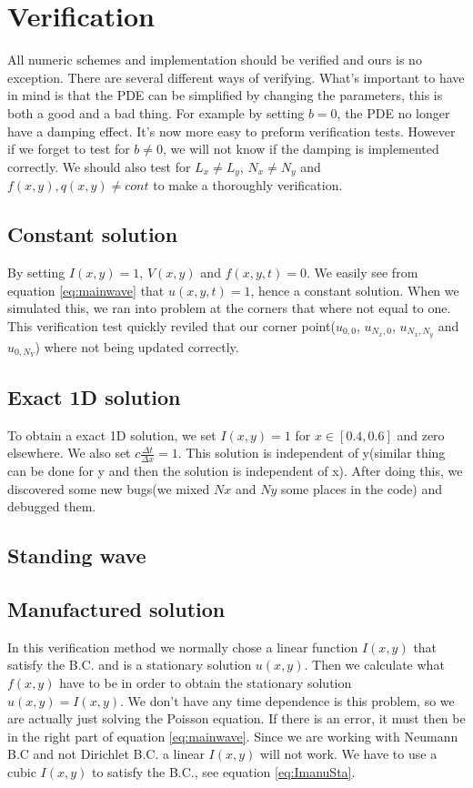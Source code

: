 \documentclass[12pt,a4paper,english]{article}
\begin{document}
\section{Verification}
All numeric schemes and implementation should be verified and ours is no exception. There are several different ways of verifying. What's important to have in mind is that the PDE can be simplified by changing the parameters, this is both a good and a bad thing. For example by setting $b = 0$, the PDE no longer have a damping effect. It's now more easy to preform verification tests. However if we forget to test for $b \neq 0$, we will not know if the damping is implemented correctly. We should also test for $L_x \neq L_y$, $N_x \neq N_y$ and $f(x,y), q(x,y) \neq cont$ to make a thoroughly verification.
\subsection{Constant solution}

By setting $I\left( x,y\right) = 1$, $V\left( x,y\right)$ and $f\left( x,y,t\right) = 0$. We easily see from equation \ref{eq:mainwave} that $u\left( x,y,t\right) = 1$, hence a constant solution. When we simulated this, we ran into problem at the corners that where not equal to one. This verification test quickly reviled that our corner point($u_{0,0}$, $u_{N_x,0}$, $u_{N_x,N_y}$ and $u_{0,N_Y}$) where not being updated correctly.   

\subsection{Exact 1D solution}
To obtain a exact 1D solution, we set $I\left( x,y\right) = 1$ for $x \in \left[0.4 , 0.6\right]$ and zero elsewhere. We also set $c\frac{\Delta t}{\Delta x} = 1$. This solution is independent of y(similar thing can be done for y and then the solution is independent of x). After doing this, we discovered some new bugs(we mixed $Nx$ and $Ny$ some places in the code) and debugged them. 

\subsection{Standing wave}

\subsection{Manufactured solution}
In this verification method we normally chose a linear function $I\left( x,y\right)$ that satisfy the B.C. and is a stationary solution $u\left( x,y\right)$. Then we calculate what $f\left( x,y\right)$ have to be in order to obtain the stationary solution $u\left( x,y\right) = I\left( x,y\right)$. We don't have any time dependence is this problem, so we are actually just solving the Poisson equation. If there is an error, it must then be in the right part of equation \ref{eq:mainwave}. Since we are working with Neumann B.C and not Dirichlet B.C. a linear $I\left( x,y\right)$ will not work. We have to use a cubic $I\left( x,y\right)$ to satisfy the B.C., see equation \ref{eq:ImanuSta}.
\end{document}
